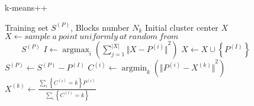\begin{itemize}
\end{itemize}

\begin{algorithm}
    \caption{k-means++}
    \label{kmeans}
    \begin{algorithmic}[1] 
        \Require Training set $S^{\left(P\right)}$, Blocks number $N_k$
        \Ensure Initial cluster center $X$
            \State $X \gets sample \ a \ point \ uniformly \ at \ random \ from$ \\$ \qquad S^{\left(P\right)}$
                    \State $I \gets \mathop{\arg\max}_{i}\left({\sum_{j=1}^{\vert X \vert} {\Vert X - P^{\left( i \right)} \Vert}^2  }\right)$
                    \State $X \gets X \cup \left\{ P^{\left( I \right)} \right\}$
                    \State $S^{\left( P \right)} \gets S^{\left( P \right)} - P^{\left( I \right)}$
                \EndFor
            \EndWhile
            \State {}
        \EndFunction
        \State
       \State $C^{\left(i\right)} \gets \mathop{\arg\min}_{k}{\left( {\Vert P^{\left(i\right)} - X^{\left(k\right)}\Vert} ^2\right)}$
                \EndFor
       \State $X^{\left(k\right)} \gets \frac{\sum_{i}{\left\{C^{\left(i\right)}=k\right\}P^{\left(i\right)}}}{\sum_{i}{\left\{C^{\left(i\right)}=k\right\}}}$
                \EndFor
            \EndWhile
            \State {}
        \EndFunction
    \end{algorithmic}
\end{algorithm}

